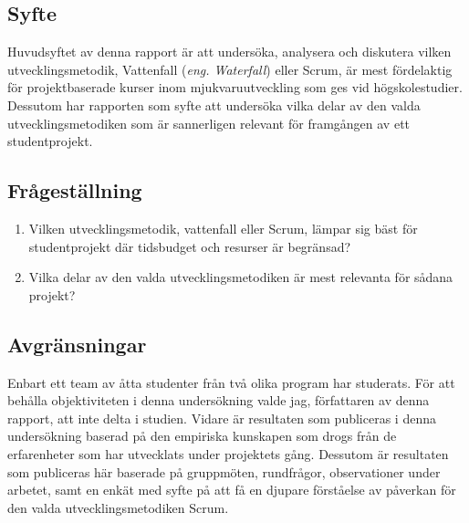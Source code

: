 \subsection{Syfte}
Huvudsyftet av denna rapport är att undersöka, analysera och diskutera vilken utvecklingsmetodik, Vattenfall (\textit{eng. Waterfall}) eller Scrum,
är mest fördelaktig för projektbaserade kurser inom mjukvaruutveckling som ges vid högskolestudier. Dessutom har rapporten som syfte att undersöka vilka delar av den valda utvecklingsmetodiken som är sannerligen relevant för framgången av ett studentprojekt.

\subsection{Frågeställning}
\label{subsec:Lieth_Wahid-research-questions}

\begin{enumerate}
	
	\item Vilken utvecklingsmetodik, vattenfall eller Scrum, lämpar sig bäst för studentprojekt där tidsbudget och resurser är begränsad? \label{LeyQ1}
	
	\item  Vilka delar av den valda utvecklingsmetodiken är mest relevanta för sådana projekt? \label{LeyQ2}
	
\end{enumerate}

\subsection{Avgränsningar}
\label{subsec:Lieth_Wahid-delimitations}
Enbart ett team av åtta studenter från två olika program har studerats. För att behålla objektiviteten i denna undersökning valde jag, författaren av denna rapport, att inte delta i studien. Vidare är resultaten som publiceras i denna undersökning baserad på den empiriska kunskapen som drogs från de erfarenheter som har utvecklats under projektets gång. Dessutom är resultaten som publiceras här baserade på gruppmöten, rundfrågor, observationer under arbetet, samt en enkät med syfte på att få en djupare förståelse av påverkan för den valda utvecklingsmetodiken Scrum. 



